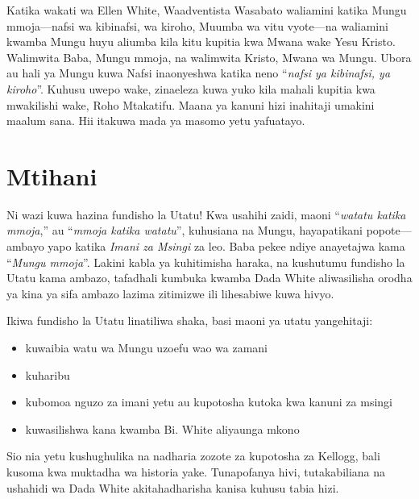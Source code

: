 Katika wakati wa Ellen White, Waadventista Wasabato waliamini katika Mungu mmoja—nafsi wa kibinafsi, wa kiroho, Muumba wa vitu vyote—na waliamini kwamba Mungu huyu aliumba kila kitu kupitia kwa Mwana wake Yesu Kristo. Walimwita Baba, Mungu mmoja, na walimwita Kristo, Mwana wa Mungu. Ubora au hali ya Mungu kuwa Nafsi inaonyeshwa katika neno “\textit{nafsi ya kibinafsi, ya kiroho}”. Kuhusu uwepo wake,  zinaeleza kuwa yuko kila mahali kupitia kwa mwakilishi wake, Roho Mtakatifu. Maana ya kanuni hizi inahitaji umakini maalum sana. Hii itakuwa mada ya masomo yetu yafuatayo.


\section*{Mtihani}


Ni wazi kuwa  hazina fundisho la Utatu! Kwa usahihi zaidi, maoni “\textit{watatu katika mmoja},” au “\textit{mmoja katika watatu}”, kuhusiana na Mungu, hayapatikani popote—ambayo yapo katika \textit{Imani za Msingi} za leo. Baba pekee ndiye anayetajwa kama “\textit{Mungu mmoja}”. Lakini kabla ya kuhitimisha haraka, na kushutumu fundisho la Utatu kama ambazo, tafadhali kumbuka kwamba Dada White aliwasilisha orodha ya kina ya sifa ambazo lazima zitimizwe ili lihesabiwe kuwa hivyo.


Ikiwa fundisho la Utatu linatiliwa shaka, basi maoni ya utatu yangehitaji:
\begin{itemize}
    \item kuwaibia watu wa Mungu uzoefu wao wa zamani
    \item kuharibu 
    \item kubomoa nguzo za imani yetu au kupotosha kutoka kwa kanuni za msingi
    \item kuwasilishwa kana kwamba Bi. White aliyaunga mkono
\end{itemize}


Sio nia yetu kushughulika na nadharia zozote za kupotosha za Kellogg, bali kusoma  kwa muktadha wa historia yake. Tunapofanya hivi, tutakabiliana na ushahidi wa Dada White akitahadharisha kanisa kuhusu tabia hizi.



